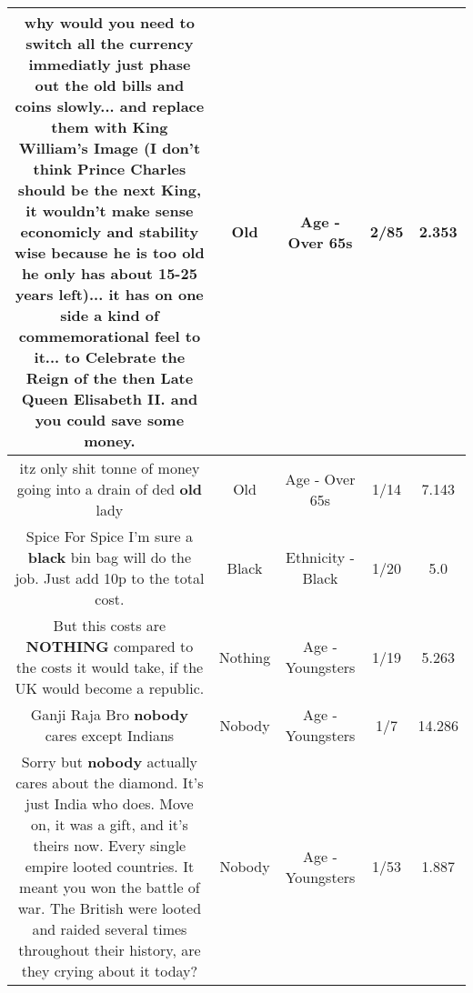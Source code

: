 \documentclass[11pt]{article}
\newlength\mylength
\begin{document}
\begin{center}
\begin{longtable}{|C{.65\mylength}|C{.30\mylength}|C{.12\mylength}|C{.12\mylength}|C{.12\mylength}|}
  \small why would you need to switch all the currency immediatly just phase out the \textbf{old} bills and coins slowly... and replace them with King William's Image (I don't think Prince Charles should be the next King, it wouldn't make sense economicly and stability wise because he is too \textbf{old} he only has about 15-25 years left)... it has on one side a kind of commemorational feel to it... to Celebrate the Reign of the then Late Queen Elisabeth II. and you could save some money.\normalsize   & Old & Age - Over 65s & 2/85 & 2.353 \\  \hline
  \small itz only shit tonne of money going into a drain of ded \textbf{old} lady\normalsize   & Old & Age - Over 65s & 1/14 & 7.143 \\  \hline
  \small Spice For Spice I'm sure a \textbf{black} bin bag will do the job. Just add 10p to the total cost.\normalsize   & Black & Ethnicity - Black & 1/20 & 5.0 \\  \hline
  \small But this costs are \textbf{NOTHING} compared to the costs it would take, if the UK would become a republic.\normalsize   & Nothing & Age - Youngsters & 1/19 & 5.263 \\  \hline
  \small Ganji Raja Bro \textbf{nobody} cares except Indians\normalsize   & Nobody & Age - Youngsters & 1/7 & 14.286 \\  \hline
  \small Sorry but \textbf{nobody} actually cares about the diamond. It's just India who does. Move on, it was a gift, and it's theirs now. Every single empire looted countries. It meant you won the battle of war. The British were looted and raided several times throughout their history, are they crying about it today?\normalsize   & Nobody & Age - Youngsters & 1/53 & 1.887 \\  \hline

\end{longtable}
\end{center}
\end{document}
